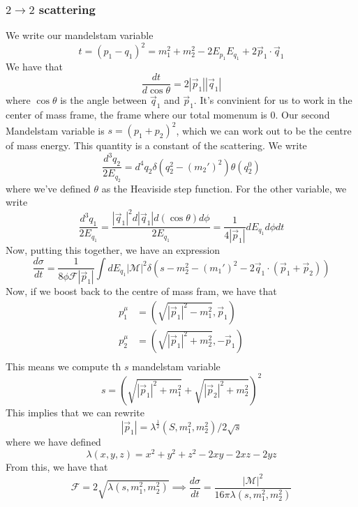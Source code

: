 \subsubsection{$ 2 \to 2 $ scattering} 
We write our mandelstam variable 
\[
	t =  ( p_1 - q_1) ^ 2 = m_1 ^ 2 + m_2 ^ 2 - 2 E_{ p _ 1 } E _{ q _ 1 } + 2 
	\vec{p} _ 1 \cdot  \vec{q} _ 1 
\] We have that 
\[
\frac{ d t }{ d \cos \theta } = 2 | \vec{p} _ 1 | | \vec{q} _ 1 | 
\] where  $ \cos \theta $ is the angle between $ \vec{q}  _ 1 $ and $ \vec{p} _ 1 $. 
It's convinient for us to work in the center of mass frame, 
the frame where our total momenum is $ 0 $. 
Our second Mandelstam variable is 
$ s= ( p_1 + p_2 ) ^ 2 $, which we can work out to be the centre 
of mass energy. This quantity is a constant of the scattering. 
We write 
\[
	\frac{ d ^ 3 q_2 }{ 2 E _{ q_ 2 } } = d ^ 4 q _ 2 \delta ( q_2 ^ 2 - ( m_2 ') ^ 2 ) \theta ( q_2 ^ 0 ) 
\] where we've defined $ \theta $ as the Heaviside step function. 
For the other variable, we write
\[
	\frac{ d ^ 3 q_1 }{ 2 E _{ q_1 } } = \frac{ | \vec{q} _ 1 | ^ 2 d | \vec{q} _1 | d ( \cos \theta ) 
	d \phi }{ 2 E_{ q_{1 } }} = \frac{1}{ 4 | \vec{p} _ 1 | } d E_{ q_ 1 } d \phi dt 
\] Now, putting this together, 
we have an expression 
\[
 \frac{ d \sigma }{ dt } = \frac{1}{8 \phi \mathcal{ F } | \vec{p}_ 1  | } 
 \int d E_{ q_ 1 } | \mathcal{ M } | ^ 2 \delta ( s - m_2 ^ 2  -  ( m_1')  ^ 2 - 2 \vec{q} _ 1 
 \cdot  ( \vec{p} _ 1 + \vec{p} _ 2 ) ) 
\] Now, if we boost back to the centre of mass fram, we have that 
\begin{align*}
	p_1 ^\mu & = ( \sqrt{| \vec{p} _ 1 | ^  2 - m_1 ^ 2 }, \vec{p} _ 1 )  \\
	p_2 ^ \mu &=  ( \sqrt{ | \vec{p} _ 1 | ^ 2 + m_2 ^ 2 }, - \vec{p} _ 1 )   \\
\end{align*}
This means we compute th $ s $ mandelstam variable 
\[
	s = ( \sqrt{ | \vec{p} _1 | ^ 2 + m_1 ^ 2  } + \sqrt{ | \vec{p} _ 2 |^ 2 + m_2 ^ 2  } ) ^ 2  
\] This implies that we can rewrite 
\[
	| \vec{p} _ 1 | = \lambda ^{ \frac{1}{2 } } ( S, m_1 ^ 2 , m_2 ^ 2 ) / 2 \sqrt{ s }  
\] where we have defined 
\[
 \lambda ( x, y , z ) = x^ 2 + y ^ 2 + z ^ 2 - 2xy - 2xz - 2yz
\] From this, we have that 
\[
	\mathcal{ F } = 2 \sqrt{ \lambda ( s , m_1 ^ 2 , m_2 ^ 2 ) } \implies 
	\frac{ d \sigma }{ d t } = \frac{ | \mathcal{ M } | ^ 2 }{ 16 \pi \lambda ( s , m_1 ^ 2 , m_2 ^ 2 ) }
\] 
